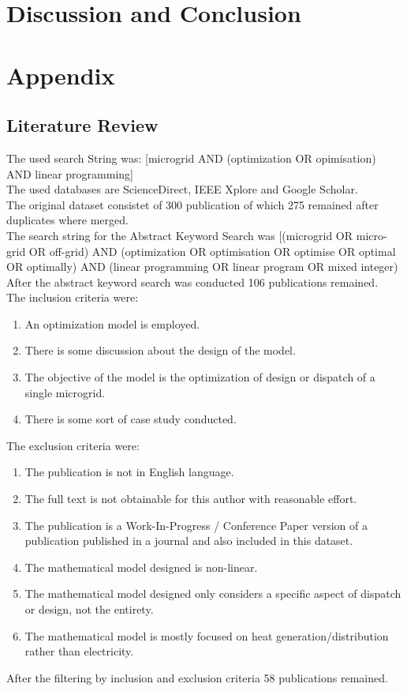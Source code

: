 \documentclass[
	11pt,								%
	DIV10,								%
	a4paper,         					%
	oneside,							%
	headheight=20pt,					%
	footheight=20pt,					%
    parskip=full,						%
    listof=totoc,						%
	bibliography=totoc,					%
	index=totoc,						%
]{scrartcl}
\begin{document}
 
\newpage
\section{Discussion and Conclusion}

\newpage


\section{Appendix}
\subsection{Literature Review}
The used search String was:  [microgrid AND (optimization OR opimisation) AND linear programming]
\\
The used databases are ScienceDirect, IEEE Xplore and Google Scholar.
\\
The original dataset consistet of 300 publication of which 275 remained after duplicates where merged.
\\
The search string for the Abstract Keyword Search was [(microgrid OR micro-grid OR off-grid) AND (optimization OR optimisation OR optimise OR optimal OR optimally) AND (linear programming OR linear program OR mixed integer)
\\
After the abstract keyword search was conducted 106 publications remained.
\\
The inclusion criteria were:
\begin{enumerate}
	\item An optimization model is employed.
	\item There is some discussion about the design of the model.
	\item The objective of the model is the optimization of design or dispatch of a single microgrid.
	\item There is some sort of case study conducted.
\end{enumerate}
The exclusion criteria were:
\begin{enumerate}
	\item The publication is not in English language.
	\item The full text is not obtainable for this author with reasonable effort.
	\item The publication is a Work-In-Progress / Conference Paper version of a publication published in a journal and also included in this dataset.
	\item The mathematical model designed is non-linear.
	\item The mathematical model designed only considers a specific aspect of dispatch or design, not the entirety.
	\item The mathematical model is mostly focused on heat generation/distribution rather than electricity.
\end{enumerate}
After the filtering by inclusion and exclusion criteria 58 publications remained.
\end{document}
